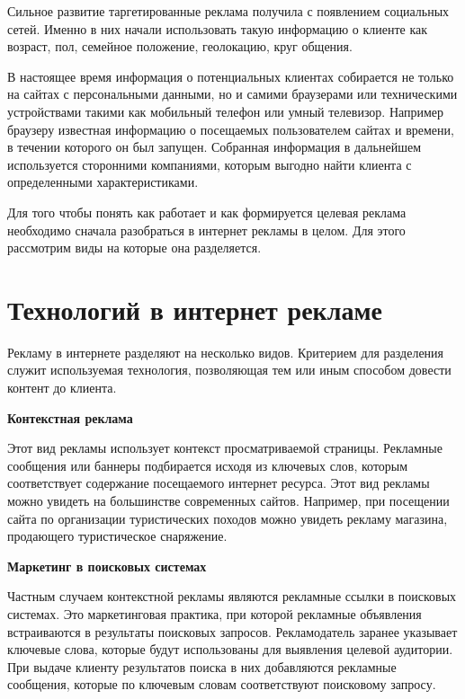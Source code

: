 Сильное развитие таргетированные реклама получила с появлением социальных сетей. Именно в них начали использовать такую информацию о клиенте как возраст, пол, семейное положение, геолокацию, круг общения. 

В настоящее время информация о потенциальных клиентах собирается не только на сайтах с персональными данными, но и самими браузерами или техническими устройствами такими как мобильный телефон или умный телевизор. Например браузеру известная информацию о посещаемых пользователем сайтах и времени, в течении которого он был запущен. Собранная информация в дальнейшем используется сторонними компаниями, которым выгодно найти клиента с определенными характеристиками. 

Для того чтобы понять как работает и как формируется целевая реклама необходимо сначала разобраться в интернет рекламы в целом. Для этого рассмотрим виды на которые она разделяется.

\section{Технологий в интернет рекламе}

Рекламу в интернете разделяют на несколько видов. Критерием для разделения служит используемая технология, позволяющая тем или иным способом довести контент до клиента.

\textbf{Контекстная реклама}

Этот вид рекламы использует контекст просматриваемой страницы. Рекламные сообщения или баннеры подбирается исходя из ключевых слов, которым соответствует содержание посещаемого интернет ресурса. Этот вид рекламы можно увидеть на большинстве современных сайтов. Например, при посещении сайта по организации туристических походов можно увидеть рекламу магазина, продающего туристическое снаряжение.
    
\textbf{Маркетинг в поисковых системах}

Частным случаем контекстной рекламы являются рекламные ссылки в поисковых системах. Это маркетинговая практика, при которой рекламные объявления встраиваются в результаты поисковых запросов. Рекламодатель заранее указывает ключевые слова, которые будут использованы для выявления целевой аудитории. При выдаче клиенту результатов поиска в них добавляются рекламные сообщения, которые по ключевым словам соответствуют поисковому запросу.

